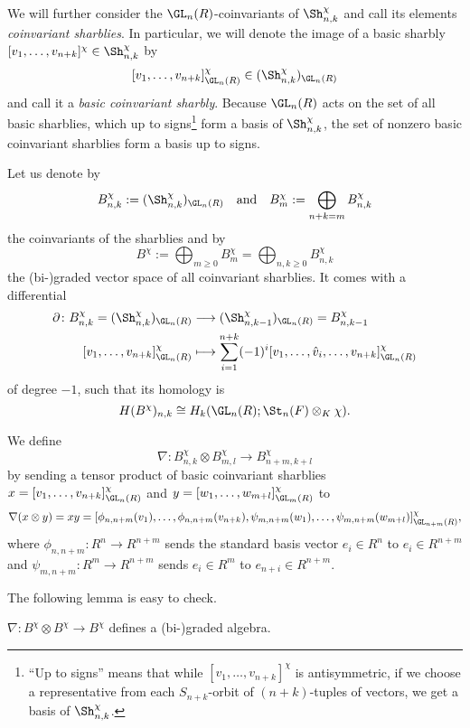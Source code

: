 We will further consider the $\GL_n(R)$-coinvariants of $\Sh^\chi_{n,k}$ and call its elements \emph{coinvariant sharblies}. In particular, we will denote the image of a basic sharbly $ [v_1, \dots, v_{n+k}]^\chi\in \Sh^\chi_{n,k}$ by
\[ [v_1, \dots, v_{n+k}]^\chi_{\GL_n(R)} \in (\Sh^\chi_{n,k})_{\GL_n(R)}\]
and call it a \emph{basic coinvariant sharbly}. Because $\GL_n(R)$ acts on the set of all basic sharblies, which up to signs\footnote{``Up to signs'' means that while $[v_1, \dots, v_{n+k}]^\chi$ is antisymmetric, if we choose a representative from each $S_{n+k}$-orbit of $(n+k)$-tuples of vectors, we get a basis of $\Sh^\chi_{n,k}$.
}
 form a basis of $\Sh^\chi_{n,k}$, the set of nonzero basic coinvariant sharblies form a basis up to signs. 

Let us denote by
\[ B^\chi_{n,k} :=  (\Sh^\chi_{n,k})_{\GL_n(R)}\quad\text{and}\quad B^\chi_m := \bigoplus_{n+k = m} B^\chi_{n,k}\]
the coinvariants of the sharblies and by
\[ B^\chi :=  \bigoplus_{m\ge0} B^\chi_m = \bigoplus_{n,k\ge0} B^\chi_{n,k}\]
the (bi-)graded vector space of all coinvariant sharblies. It comes with a differential 
\begin{align*}
 \partial\colon B^\chi_{n,k} = (\Sh^\chi_{n,k})_{\GL_n(R)} &\longrightarrow (\Sh^\chi_{n,k-1})_{\GL_n(R)} = B^\chi_{n,k-1}\\
 [v_1,\dots, v_{n+k}]^\chi_{\GL_n(R)} &\longmapsto \sum_{i=1}^{n+k}  (-1)^i[v_1,\dots,\hat v_i,\dots, v_{n+k}]^\chi_{\GL_n(R)}
 \end{align*}
of degree $-1$, such that its homology is
\[ H(B^\chi)_{n,k} \cong H_k(\GL_n(R);\St_n(F) \otimes_K \chi).\]

\begin{definition}
We define 
\[ \nabla \colon B^\chi_{n,k} \otimes B^\chi_{m,l} \longrightarrow B^\chi_{n+m,k+l}\]
by sending a tensor product of basic coinvariant sharblies $x = [v_1, \dots, v_{n+k}]^\chi_{\GL_n(R)}$ and $y =  [w_1, \dots, w_{m+l}]^\chi_{\GL_m(R)}$ to
\[ \nabla(x \otimes y) = xy = [ \phi_{n,n+m}(v_1), \dots, \phi_{n,n+m}(v_{n+k}), \psi_{m,n+m}(w_1), \dots, \psi_{m,n+m}(w_{m+l})]^\chi_{\GL_{n+m}(R)},\]
where $\phi_{n,n+m}\colon R^n \to R^{n+m}$ sends the standard basis vector $e_i \in R^n$ to $e_i \in R^{n+m}$ and $\psi_{m,n+m} \colon R^m \to R^{n+m}$ sends $e_i\in R^m$ to $e_{n+i} \in R^{n+m}$.
\end{definition}

The following lemma is easy to check.

\begin{lemma}
$\nabla \colon B^\chi \otimes B^\chi \to B^\chi$ defines a (bi-)graded algebra.
\end{lemma}

